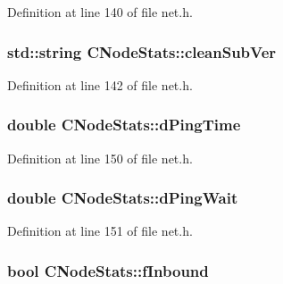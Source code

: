 Definition at line 140 of file net.\+h.

\hypertarget{class_c_node_stats_ad733b840ac9a16a7eb6166ea4984d8a8}{}
\subsubsection[{clean\+Sub\+Ver}]{\setlength{\rightskip}{0pt plus 5cm}std\+::string C\+Node\+Stats\+::clean\+Sub\+Ver}\label{class_c_node_stats_ad733b840ac9a16a7eb6166ea4984d8a8}


Definition at line 142 of file net.\+h.

\hypertarget{class_c_node_stats_a535c198cbe3af112d4538f535e6618cd}{}
\subsubsection[{d\+Ping\+Time}]{\setlength{\rightskip}{0pt plus 5cm}double C\+Node\+Stats\+::d\+Ping\+Time}\label{class_c_node_stats_a535c198cbe3af112d4538f535e6618cd}


Definition at line 150 of file net.\+h.

\hypertarget{class_c_node_stats_a03a38f87940d04b321b9fb3102d0368d}{}
\subsubsection[{d\+Ping\+Wait}]{\setlength{\rightskip}{0pt plus 5cm}double C\+Node\+Stats\+::d\+Ping\+Wait}\label{class_c_node_stats_a03a38f87940d04b321b9fb3102d0368d}


Definition at line 151 of file net.\+h.

\hypertarget{class_c_node_stats_a34627c46cac7bc2bfb3406c954522b49}{}
\subsubsection[{f\+Inbound}]{\setlength{\rightskip}{0pt plus 5cm}bool C\+Node\+Stats\+::f\+Inbound}\label{class_c_node_stats_a34627c46cac7bc2bfb3406c954522b49}



